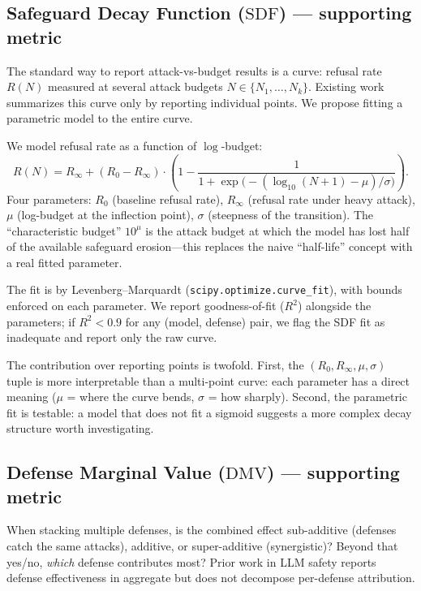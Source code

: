 \documentclass[11pt,letterpaper]{article}
\newcommand{\SDF}{\mathrm{SDF}}
\newcommand{\DMV}{\mathrm{DMV}}
\begin{document}
\subsection{Safeguard Decay Function ($\SDF$) — supporting metric}

The standard way to report attack-vs-budget results is a curve: refusal
rate $R(N)$ measured at several attack budgets $N \in \{N_1, \dots, N_k\}$.
Existing work summarizes this curve only by reporting individual points.
We propose fitting a parametric model to the entire curve.

\begin{definition}
We model refusal rate as a function of $\log$-budget:
\[
  R(N) = R_\infty + (R_0 - R_\infty) \cdot \left(1 -
  \frac{1}{1 + \exp\bigl(-(\log_{10}(N+1) - \mu)/\sigma\bigr)}\right).
\]
Four parameters: $R_0$ (baseline refusal rate), $R_\infty$ (refusal rate
under heavy attack), $\mu$ (log-budget at the inflection point), $\sigma$
(steepness of the transition). The ``characteristic budget'' $10^\mu$ is
the attack budget at which the model has lost half of the available
safeguard erosion---this replaces the naive ``half-life'' concept with a
real fitted parameter.
\end{definition}

The fit is by Levenberg--Marquardt (\texttt{scipy.optimize.curve\_fit}),
with bounds enforced on each parameter. We report goodness-of-fit ($R^2$)
alongside the parameters; if $R^2 < 0.9$ for any (model, defense) pair,
we flag the SDF fit as inadequate and report only the raw curve.

The contribution over reporting points is twofold. First, the
$(R_0, R_\infty, \mu, \sigma)$ tuple is more interpretable than a multi-point
curve: each parameter has a direct meaning ($\mu$ = where the curve bends,
$\sigma$ = how sharply). Second, the parametric fit is testable: a model
that does not fit a sigmoid suggests a more complex decay structure
worth investigating.

\subsection{Defense Marginal Value ($\DMV$) — supporting metric}

When stacking multiple defenses, is the combined effect sub-additive
(defenses catch the same attacks), additive, or super-additive
(synergistic)? Beyond that yes/no, \emph{which} defense contributes
most? Prior work in LLM safety reports defense effectiveness in
aggregate but does not decompose per-defense attribution.
\end{document}
